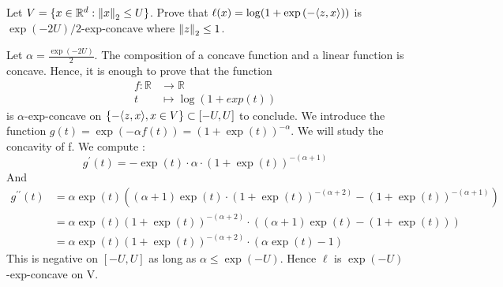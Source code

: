 \begin{exercise}[]{}
	Let $ V=\{ x\in \mathbb{R}^d : \left\|x\right\|_2 \leq U \} $. Prove that $ \ell(x) = \log(1+\exp{(-\langle z,x\rangle)}) $ is $ \exp{(-2U)}/2$-exp-concave where $ \left\|z\right\|_2 \leq 1 $.
\end{exercise}

\begin{solution}[]
	Let $ \alpha = \frac{\exp{(-2U)}}{2}$. The composition of a concave function and a linear function is concave. Hence, it is enough to prove that the function 
\begin{align*}
f : \mathbb{R}& \longrightarrow \mathbb{R} \\
t&\longmapsto \log(1+exp(t))
\end{align*}
is $ \alpha $-exp-concave on $ \{-\langle z,x\rangle, x\in V\} \subset [-U,U] $ to conclude.
We introduce the function $ g(t) = \exp{\left(-\alpha f(t) \right)} = (1+\exp{(t)})^{-\alpha} $. We will study the concavity of f. We compute :
\begin{equation*}
	g^{\prime}(t) = -\exp{(t)}\cdot \alpha \cdot (1+\exp{(t)})^{-(\alpha+1)}
\end{equation*}
And
\begin{align*}
	g^{\prime\prime}(t) &= \alpha \exp{(t)}\left( (\alpha+1)\exp{(t)}\cdot (1+\exp{(t)})^{-(\alpha+2)} - (1+\exp{(t)})^{-(\alpha+1)} \right) \\
			    &= \alpha \exp{(t)}(1+\exp{(t)})^{-(\alpha+2)}\cdot \left( (\alpha+1)\exp{(t)} - (1+\exp{(t)}) \right) \\
			    &= \alpha \exp{(t)}(1+\exp{(t)})^{-(\alpha+2)}\cdot \left(\alpha \exp{(t)} -1\right)
\end{align*}
This is negative on $ [-U,U] $ as long as $ \alpha \leq \exp{(-U)} $.
Hence $ \ell $ is $ \exp{(-U)} $-exp-concave on V.


\end{solution}

